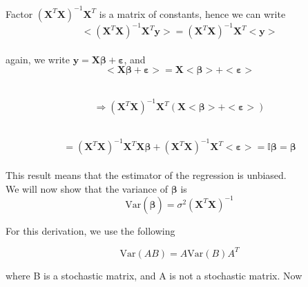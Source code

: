 \documentclass[reprint,english,notitlepage]{revtex4-1}  %
\begin{document}
    \vspace{-5pt}
    
    Factor $(\mathbf{X}^T\mathbf{X})^{-1}\mathbf{X}^T$ is a matrix of constants, hence we can write \\

    
    
    $$<(\mathbf{X}^T\mathbf{X})^{-1}\mathbf{X}^T \mathbf{y}> = (\mathbf{X}^T\mathbf{X})^{-1}\mathbf{X}^T< \mathbf{y}>$$ \\

    

    again, we write $\mathbf{y} = \mathbf{X} \boldsymbol{\beta} + \boldsymbol{\varepsilon}$, and  \\ $$<\mathbf{X} \boldsymbol{\beta} + \boldsymbol{\varepsilon}> = \mathbf{X}< \boldsymbol{\beta}> + <\boldsymbol{\varepsilon}>$$ \\

    \vspace{-40pt}

    \[ \Rightarrow (\mathbf{X}^T\mathbf{X})^{-1}\mathbf{X}^T (\mathbf{X}< \boldsymbol{\beta}> + <\boldsymbol{\varepsilon}>) \] \\

    \vspace{-40pt}

    \[ = (\mathbf{X}^T\mathbf{X})^{-1}\mathbf{X}^T \mathbf{X}\boldsymbol{\beta} + (\mathbf{X}^T\mathbf{X})^{-1}\mathbf{X}^T <\boldsymbol{\varepsilon}> = \mathbb{I} \boldsymbol{\beta} = \boldsymbol{\beta} \] \\



    
    This result means that the estimator of the regression is unbiased. \\


    We will now show that the variance of $\boldsymbol{\beta}$ is \\

    $$\mathrm{Var}(\boldsymbol{\hat{\beta}}) = \sigma^2 (\mathbf{X}^T \mathbf{X})^{-1}$$

    
    
    For this derivation, we use the following

    $$\mathrm{Var}(AB) = A \mathrm{Var}(B) A^T$$

    where B is a stochastic matrix, and A is not a stochastic matrix. Now \\
\end{document}
